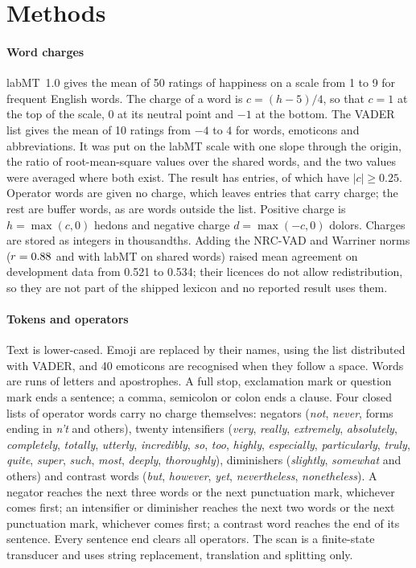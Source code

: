 \section{Methods}
\footnotesize

\paragraph{Word charges}
labMT~1.0 gives the mean of 50 ratings of happiness on a scale from 1 to 9 for \nLabmt{} frequent English words\cite{dodds2011}. The charge of a word is $c=(h-5)/4$, so that $c=1$ at the top of the scale, 0 at its neutral point and $-1$ at the bottom. The VADER list gives the mean of 10 ratings from $-4$ to $4$ for \nVader{} words, emoticons and abbreviations\cite{hutto2014}. It was put on the labMT scale with one slope through the origin, the ratio of root-mean-square values over the \nShared{} shared words, and the two values were averaged where both exist. The result has \nLexicon{} entries, of which \nCharged{} have $|c|\geq0.25$. Operator words are given no charge, which leaves \nChargedScorer{} entries that carry charge; the rest are buffer words, as are words outside the list. Positive charge is $h=\max(c,0)$ hedons and negative charge $d=\max(-c,0)$ dolors. Charges are stored as integers in thousandths. Adding the NRC-VAD\cite{mohammad2018vad} and Warriner\cite{warriner2013} norms ($r=0.88$ and \rWarriner{} with labMT on shared words) raised mean agreement on development data from 0.521 to 0.534; their licences do not allow redistribution, so they are not part of the shipped lexicon and no reported result uses them.

\paragraph{Tokens and operators}
Text is lower-cased. Emoji are replaced by their names, using the list distributed with VADER, and 40 emoticons are recognised when they follow a space. Words are runs of letters and apostrophes. A full stop, exclamation mark or question mark ends a sentence; a comma, semicolon or colon ends a clause. Four closed lists of operator words carry no charge themselves: negators (\emph{not}, \emph{never}, forms ending in \emph{n't} and others), twenty intensifiers (\emph{very}, \emph{really}, \emph{extremely}, \emph{absolutely}, \emph{completely}, \emph{totally}, \emph{utterly}, \emph{incredibly}, \emph{so}, \emph{too}, \emph{highly}, \emph{especially}, \emph{particularly}, \emph{truly}, \emph{quite}, \emph{super}, \emph{such}, \emph{most}, \emph{deeply}, \emph{thoroughly}), diminishers (\emph{slightly}, \emph{somewhat} and others) and contrast words (\emph{but}, \emph{however}, \emph{yet}, \emph{nevertheless}, \emph{nonetheless}). A negator reaches the next three words or the next punctuation mark, whichever comes first; an intensifier or diminisher reaches the next two words or the next punctuation mark, whichever comes first; a contrast word reaches the end of its sentence. Every sentence end clears all operators. The scan is a finite-state transducer and uses string replacement, translation and splitting only.

